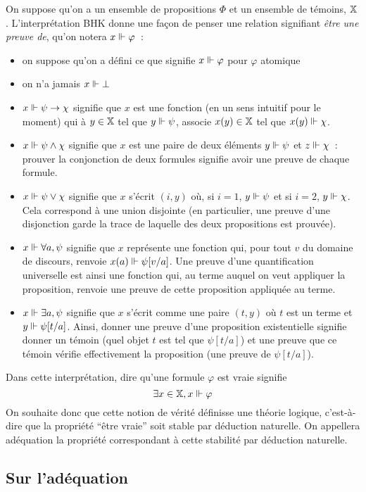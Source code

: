 \documentclass{article}
\begin{document}
On suppose qu'on a un ensemble de propositions $\Phi$ et un ensemble de témoins, $\mathbb X$. L'interprétation BHK donne une façon de penser une relation signifiant \textit{être une preuve de}, qu'on notera $x\Vdash \varphi$~:
\begin{itemize}
\item on suppose qu'on a défini ce que signifie $x\Vdash\varphi$ pour $\varphi$ atomique
\item on n'a jamais $x\Vdash \bot$
\item $x\Vdash\psi \to\chi$ signifie que $x$ est une fonction (en un sens intuitif pour le moment) qui à $y\in \mathbb X$ tel que $y\Vdash \psi$, associe $x(y)\in \mathbb X$ tel que $x(y)\Vdash \chi$.
\item $x\Vdash \psi\land \chi$ signifie que $x$ est une paire de deux éléments $y\Vdash \psi$ et $z\Vdash \chi$~: prouver la conjonction de deux formules signifie avoir une preuve de chaque formule.
\item $x\Vdash\psi\lor \chi$ signifie que $x$ s'écrit $(i,y)$ où, si $i = 1$, $y\Vdash \psi$ et si $i = 2$, $y\Vdash \chi$. Cela correspond à une union disjointe (en particulier, une preuve d'une disjonction garde la trace de laquelle des deux propositions est prouvée).
\item $x\Vdash\forall a, \psi$ signifie que $x$ représente une fonction qui, pour tout $v$ du domaine de discours, renvoie $x(a)\Vdash \psi[v/a]$. Une preuve d'une quantification universelle est ainsi une fonction qui, au terme auquel on veut appliquer la proposition, renvoie une preuve de cette proposition appliquée au terme.
\item $x\Vdash \exists a, \psi$ signifie que $x$ s'écrit comme une paire $(t,y)$ où $t$ est un terme et $y\Vdash \psi[t/a]$. Ainsi, donner une preuve d'une proposition existentielle signifie donner un témoin (quel objet $t$ est tel que $\psi[t/a]$) et une preuve que ce témoin vérifie effectivement la proposition (une preuve de $\psi[t/a]$).
\end{itemize}

Dans cette interprétation, dire qu'une formule $\varphi$ est vraie signifie
\[\exists x \in \mathbb X, x \Vdash \varphi\]
On souhaite donc que cette notion de vérité définisse une théorie logique, c'est-à-dire que la propriété ``être vraie'' soit stable par déduction naturelle. On appellera adéquation la propriété correspondant à cette stabilité par déduction naturelle.

\subsection{Sur l'adéquation}
\end{document}
